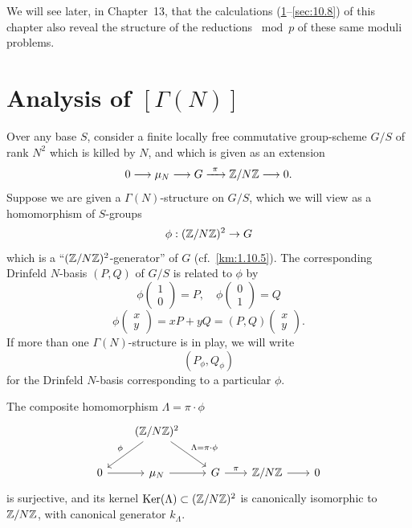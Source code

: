We will see later, in Chapter~13, that the calculations (\ref{sec:10.2}--\ref{sec:10.8}) of this chapter also reveal the structure of the reductions $\bmod p$ of these same moduli problems.


\section{Analysis of $[\Gamma(N)]$}
\label{sec:10.2}

\kmitem\label{item:10.2.1}
Over any base $S$, consider a finite locally free commutative group-scheme $G/S$ of rank $N^2$ which is killed by $N$, and which is given as an extension
\[
0 \longrightarrow \mu_N \longrightarrow G \xrightarrow{\ \pi\ } \mathbb{Z}/N\mathbb{Z} \longrightarrow 0 .
\]
Suppose we are given a $\Gamma(N)$-structure on $G/S$, which we will view as a homomorphism of $S$-groups
\[
\phi : (\mathbb{Z}/N\mathbb{Z})^2 \to G
\]
which is a ``$(\mathbb{Z}/N\mathbb{Z})^2$-generator'' of $G$ (cf.~\ref{km:1.10.5}). The corresponding Drinfeld $N$-basis $(P,Q)$ of $G/S$ is related to $\phi$ by
\[
\phi\begin{pmatrix} 1 \\ 0 \end{pmatrix} = P , \quad \phi\begin{pmatrix} 0 \\ 1 \end{pmatrix} = Q
\]
\[
\phi\begin{pmatrix} x \\ y \end{pmatrix} = x P + y Q = (P,Q)\begin{pmatrix} x \\ y \end{pmatrix} .
\]
If more than one $\Gamma(N)$-structure is in play, we will write
\[
(P_\phi, Q_\phi)
\]
for the Drinfeld $N$-basis corresponding to a particular $\phi$.

\begin{klem}\label{lem:10.2.2}
The composite homomorphism $\Lambda = \pi \cdot \phi$
\begin{equation*}
\begin{tikzcd}[row sep=2em, column sep=2em]
& (\Z/N\Z)^2 \arrow[ld, "\phi"'] \arrow[rd, "\Lambda = \pi \cdot \phi"] & \\
0 \arrow[r] & \mu_N \arrow[r] & G \arrow[r, "\pi"] & \Z/N\Z \arrow[r] & 0
\end{tikzcd}
\end{equation*}
is surjective, and its kernel $\operatorname{Ker}(\Lambda) \subset (\mathbb{Z}/N\mathbb{Z})^2$ is canonically isomorphic to $\mathbb{Z}/N\mathbb{Z}$, with canonical generator $k_\Lambda$.
\end{klem}

